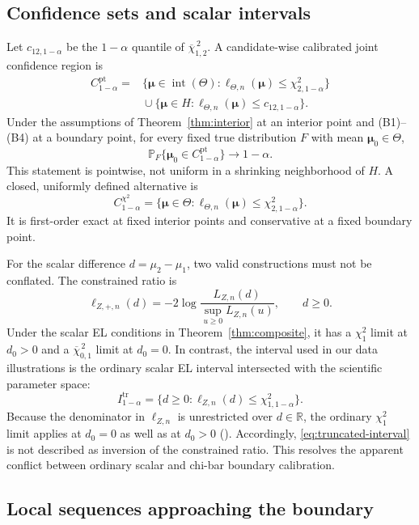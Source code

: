 \documentclass[11pt]{article}
\theoremstyle{remark}
\newcommand{\R}{\mathbb{R}}
\newcommand{\Pp}{\mathbb{P}}
\newcommand{\interior}{\operatorname{int}}
\newcommand{\barchi}[2]{\overline{\chi}^{\,2}_{#1,#2}}
\begin{document}
\subsection{Confidence sets and scalar intervals}

Let $c_{12,1-\alpha}$ be the $1-\alpha$ quantile of $\barchi{1}{2}$.  A candidate-wise calibrated joint confidence region is
\begin{align*}
  C^{\mathrm{pt}}_{1-\alpha}
  ={}&
  \{\boldsymbol{\mu}\in\interior(\Theta):
  \ell_{\Theta,n}(\boldsymbol{\mu})\leq\chi^2_{2,1-\alpha}\}\\
  &{}\cup
  \{\boldsymbol{\mu}\in H:
  \ell_{\Theta,n}(\boldsymbol{\mu})\leq c_{12,1-\alpha}\}.
\end{align*}
Under the assumptions of Theorem~\ref{thm:interior} at an interior point and (B1)--(B4) at a boundary point, for every fixed true distribution $F$ with mean $\boldsymbol{\mu}_0\in\Theta$,
$$
  \Pp_F\{\boldsymbol{\mu}_0\in C^{\mathrm{pt}}_{1-\alpha}\}\to1-\alpha.
$$
This statement is pointwise, not uniform in a shrinking neighborhood of $H$.  A closed, uniformly defined alternative is
$$
  C^{\chi^2}_{1-\alpha}
  =
  \{\boldsymbol{\mu}\in\Theta:
  \ell_{\Theta,n}(\boldsymbol{\mu})\leq\chi^2_{2,1-\alpha}\}.
$$
It is first-order exact at fixed interior points and conservative at a fixed boundary point.

For the scalar difference $d=\mu_2-\mu_1$, two valid constructions must not be conflated.  The constrained ratio is
$$
  \ell_{Z,+,n}(d)
  =
  -2\log
  \frac{L_{Z,n}(d)}{\sup_{u\geq0}L_{Z,n}(u)},
  \qquad d\geq0.
$$
Under the scalar EL conditions in Theorem~\ref{thm:composite}, it has a $\chi^2_1$ limit at $d_0>0$ and a $\barchi{0}{1}$ limit at $d_0=0$.  In contrast, the interval used in our data illustrations is the ordinary scalar EL interval intersected with the scientific parameter space:
\begin{equation}\label{eq:truncated-interval}
  I^{\mathrm{tr}}_{1-\alpha}
  =
  \{d\geq0:\ell_{Z,n}(d)\leq\chi^2_{1,1-\alpha}\}.
\end{equation}
Because the denominator in $\ell_{Z,n}$ is unrestricted over $d\in\R$, the ordinary $\chi^2_1$ limit applies at $d_0=0$ as well as at $d_0>0$ (\citet{owen1988empirical}).  Accordingly, \eqref{eq:truncated-interval} is not described as inversion of the constrained ratio. This resolves the apparent conflict between ordinary scalar and chi-bar boundary calibration.

\subsection{Local sequences approaching the boundary}
\end{document}
